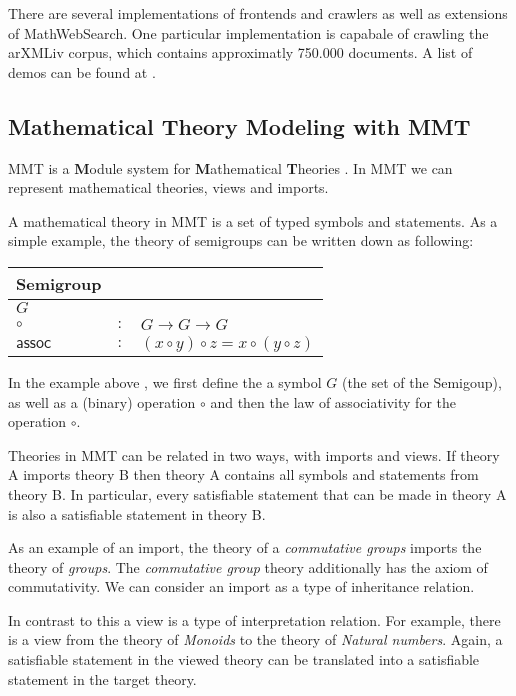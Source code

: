 \documentclass[11pt]{article}
\begin{document}
There are several implementations of frontends and crawlers as well as extensions of MathWebSearch. One particular implementation is capabale of crawling the arXMLiv corpus, which contains approximatly 750.000 documents. A list of demos can be found at \cite{URL:MWSDemo}.

\subsection{Mathematical Theory Modeling with MMT}
\label{sec:mws:mmt}

MMT is a \textbf{M}odule system for \textbf{M}athematical \textbf{T}heories \cite{RabKoh:WSMSML13}. In MMT we can represent mathematical theories, views and imports.

A mathematical theory in MMT is a set of typed symbols and statements. As a simple example, the theory of semigroups can be written down as following:

\begin{tabular}{|l c l|}
  \hline
  \textsf{Semigroup} & &\\\hline
  $G$ & &\\
  $\circ$ & $:$ & $ G \rightarrow G \rightarrow G$\\
  $\scriptstyle \mathsf{assoc}$& $:$ & $(x\circ y)\circ z=x\circ (y\circ z)$\\\hline
\end{tabular}

In the example above , we first define the a symbol $G$ (the set of the Semigoup), as well as a (binary) operation $\circ$ and then the law of associativity for the operation $\circ$.

Theories in MMT can be related in two ways, with imports and views. If theory A imports theory B then theory A contains all symbols and statements from theory B. In particular, every satisfiable statement that can be made in theory A is also a satisfiable statement in theory B.

As an example of an import, the theory of a \textit{commutative groups} imports the theory of \textit{groups}. The \textit{commutative group} theory additionally has the axiom of commutativity. We can consider an import as a type of inheritance relation.

In contrast to this a view is a type of interpretation relation. For example, there is a view from the theory of \textit{Monoids} to the theory of \textit{Natural numbers}. Again, a satisfiable statement in the viewed theory can be translated into a satisfiable statement in the target theory.
\end{document}

